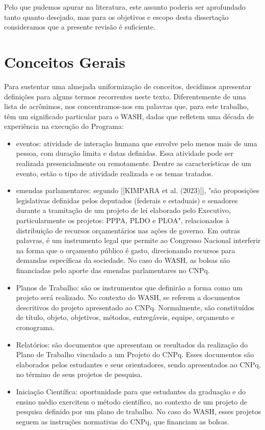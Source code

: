 Pelo que pudemos apurar na literatura, este assunto poderia ser aprofundado tanto quanto desejado, mas para os objetivos e escopo desta dissertação consideramos que a presente revisão é suficiente.

\section[Conceitos Gerais]{Conceitos Gerais}\label{Conceitos Gerais}
Para sustentar uma almejada uniformização de conceitos, decidimos apresentar definições para alguns termos recorrentes neste texto. Diferentemente de uma lista de acrônimos, nos concentramos-nos em palavras que, para este trabalho, têm um significado particular para o  WASH, dadas que refletem uma década de experiência na execução do Programa:


\begin{itemize}
\item eventos: atividade de interação humana que envolve pelo menos mais de uma pessoa, com duração limita e datas definidas. Essa atividade pode ser realizada presencialmente ou remotamente. Dentre as características de um evento, estão o tipo de atividade realizada e os temas tratados.
\item emendas parlamentares: segundo  [[KIMPARA et al. (2023)]],  "são proposições legislativas definidas pelos deputados (federais e estaduais) e senadores durante a tramitação de um projeto de lei elaborado pelo Executivo, particularmente os projetos: PPPA, PLDO e PLOA", relacionados à distribuição de recursos orçamentários nas ações de governo. Em outras palavras, é um instrumento legal que permite ao Congresso Nacional interferir na forma que o orçamento público é gasto, direcionando recursos para demandas específicas da sociedade. No caso do WASH, as bolsas são financiadas pelo aporte das emendas parlamentares no CNPq.
\item Planos de Trabalho: são os instrumentos que definirão a forma como um projeto será realizado. No contexto do WASH, se referem a documentos descritivos do projeto apresentado ao CNPq. Normalmente, são constituídos de título, objeto, objetivos, métodos, entregáveis, equipe, orçamento e cronograma.
\item Relatórios: são documentos que apresentam os resultados da realização do Plano de Trabalho vinculado a um Projeto do CNPq. Esses documentos são elaborados pelos estudantes e seus orientadores, sendo apresentados ao CNPq, no término de seus projetos de pesquisa.
\item Iniciação Científica: oportunidade para que estudantes da graduação e do ensino médio exercitem o método científico, no contexto de um projeto de pesquisa definido por um plano de trabalho. No caso do WASH, esses projetos seguem as instruções normativas do CNPq, que financiam as bolsas.
\end{itemize}


